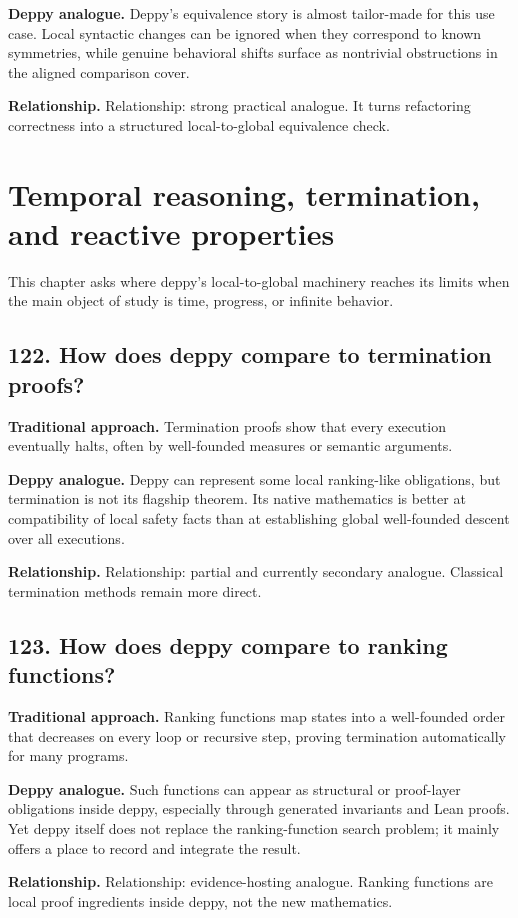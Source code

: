 \documentclass[11pt,openany]{book}
\begin{document}
\textbf{Deppy analogue.} Deppy's equivalence story is almost tailor-made for this use case. Local syntactic changes can be ignored when they correspond to known symmetries, while genuine behavioral shifts surface as nontrivial obstructions in the aligned comparison cover.

\textbf{Relationship.} Relationship: strong practical analogue. It turns refactoring correctness into a structured local-to-global equivalence check.

\chapter{Temporal reasoning, termination, and reactive properties}
This chapter asks where deppy's local-to-global machinery reaches its limits when the main object of study is time, progress, or infinite behavior.

\section*{122. How does deppy compare to termination proofs?}
\textbf{Traditional approach.} Termination proofs show that every execution eventually halts, often by well-founded measures or semantic arguments.

\textbf{Deppy analogue.} Deppy can represent some local ranking-like obligations, but termination is not its flagship theorem. Its native mathematics is better at compatibility of local safety facts than at establishing global well-founded descent over all executions.

\textbf{Relationship.} Relationship: partial and currently secondary analogue. Classical termination methods remain more direct.

\section*{123. How does deppy compare to ranking functions?}
\textbf{Traditional approach.} Ranking functions map states into a well-founded order that decreases on every loop or recursive step, proving termination automatically for many programs.

\textbf{Deppy analogue.} Such functions can appear as structural or proof-layer obligations inside deppy, especially through generated invariants and Lean proofs. Yet deppy itself does not replace the ranking-function search problem; it mainly offers a place to record and integrate the result.

\textbf{Relationship.} Relationship: evidence-hosting analogue. Ranking functions are local proof ingredients inside deppy, not the new mathematics.
\end{document}

